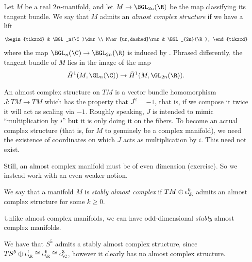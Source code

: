 \documentclass[11pt]{book}
\begin{document}
\begin{definition}\label{def:almost-complex-structure} Let $M$ be a real $2n$-manifold, and let $M \to \BGL_{2n}(\R)$ be the map classifying its tangent bundle. We say that $M$ admits an \emph{almost complex structure} if we have a lift
\[ \begin{tikzcd}
     & \BGL_n(\C)\dar\\
    M\ar[ur,dashed]\rar & \BGL_{2n}(\R),
\end{tikzcd} \]
where the map $\BGL_n(\C) \to \BGL_{2n}(\R)$ is induced by . Phrased differently, the tangent bundle of $M$ lies in the image of the map
\begin{align*}
    \check{H}^1(M,\GL_n(\C)) \to \check{H}^1(M,\GL_{2n}(\R)).
\end{align*}
\end{definition}

\begin{remark} An almost complex structure on $TM$ is a vector bundle homomorphism $J \colon TM \to TM$ which has the property that $J^2 = -1$, that is, if we compose it twice it will act as scaling via $-1$. Roughly speaking, $J$ is intended to mimic ``multiplication by $i$'' but it is only doing it on the fibers. To become an actual complex structure (that is, for $M$ to genuinely be a complex manifold), we need the existence of coordinates on which $J$ acts as multiplication by $i$. This need not exist.
\end{remark}

Still, an almost complex manifold must be of even dimension (exercise). So we instead work with an even weaker notion.

\begin{definition}\label{def:stably-almost-complex-manifold} We say that a manifold $M$ is \emph{stably almost complex} if $TM \oplus \epsilon_\R^k$ admits an almost complex structure for some $k\ge0$.
\end{definition}

Unlike almost complex manifolds, we can have odd-dimensional \emph{stably} almost complex manifolds.

\begin{example} We have that $S^5$ admits a stably almost complex structure, since $TS^5 \oplus \epsilon_\R^1 \cong \epsilon_\R^6 \cong \epsilon_\C^3$, however it clearly has no almost complex structure.
\end{example}
\end{document}
